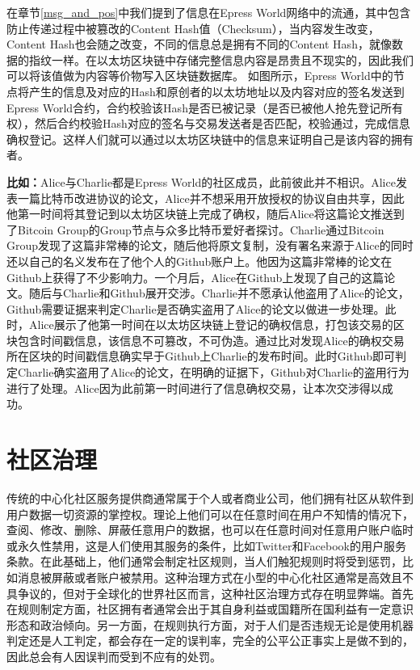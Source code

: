 \documentclass[12pt,a4paper]{extarticle}
\begin{document}
    在章节\ref{msg_and_pos}中我们提到了信息在Epress World网络中的流通，其中包含防止传递过程中被篡改的Content Hash值（Checksum），当内容发生改变，Content Hash也会随之改变，不同的信息总是拥有不同的Content Hash，就像数据的指纹一样。在以太坊区块链中存储完整信息内容是昂贵且不现实的，因此我们可以将该值做为内容等价物写入区块链数据库。
    如图所示，Epress World中的节点将产生的信息及对应的Hash和原创者的以太坊地址以及内容对应的签名发送到Epress World合约，合约校验该Hash是否已被记录（是否已被他人抢先登记所有权），然后合约校验Hash对应的签名与交易发送者是否匹配，校验通过，完成信息确权登记。这样人们就可以通过以太坊区块链中的信息来证明自己是该内容的拥有者。
    ~\newline
    \begin{blockqt}
    \textbf{比如：}Alice与Charlie都是Epress World的社区成员，此前彼此并不相识。Alice发表一篇比特币改进协议的论文，Alice并不想采用开放授权的协议自由共享，因此他第一时间将其登记到以太坊区块链上完成了确权，随后Alice将这篇论文推送到了Bitcoin Group的Group节点与众多比特币爱好者探讨。Charlie通过Bitcoin Group发现了这篇非常棒的论文，随后他将原文复制，没有署名来源于Alice的同时还以自己的名义发布在了他个人的Github账户上。他因为这篇非常棒的论文在Github上获得了不少影响力。一个月后，Alice在Github上发现了自己的这篇论文。随后与Charlie和Github展开交涉。Charlie并不愿承认他盗用了Alice的论文，Github需要证据来判定Charlie是否确实盗用了Alice的论文以做进一步处理。此时，Alice展示了他第一时间在以太坊区块链上登记的确权信息，打包该交易的区块包含时间戳信息，该信息不可篡改，不可伪造。通过比对发现Alice的确权交易所在区块的时间戳信息确实早于Github上Charlie的发布时间。此时Github即可判定Charlie确实盗用了Alice的论文，在明确的证据下，Github对Charlie的盗用行为进行了处理。Alice因为此前第一时间进行了信息确权交易，让本次交涉得以成功。
    \end{blockqt}
\section{社区治理}
    传统的中心化社区服务提供商通常属于个人或者商业公司，他们拥有社区从软件到用户数据一切资源的掌控权。理论上他们可以在任意时间在用户不知情的情况下，查阅、修改、删除、屏蔽任意用户的数据，也可以在任意时间对任意用户账户临时或永久性禁用，这是人们使用其服务的条件，比如Twitter\cite{twitter_tos}和Facebook\cite{facebook_tos}的用户服务条款。在此基础上，他们通常会制定社区规则，当人们触犯规则时将受到惩罚，比如消息被屏蔽或者账户被禁用。这种治理方式在小型的中心化社区通常是高效且不具争议的，但对于全球化的世界社区而言，这种社区治理方式存在明显弊端。首先在规则制定方面，社区拥有者通常会出于其自身利益或国籍所在国利益有一定意识形态和政治倾向。另一方面，在规则执行方面，对于人们是否违规无论是使用机器判定还是人工判定，都会存在一定的误判率，完全的公平公正事实上是做不到的，因此总会有人因误判而受到不应有的处罚。
\end{document}
